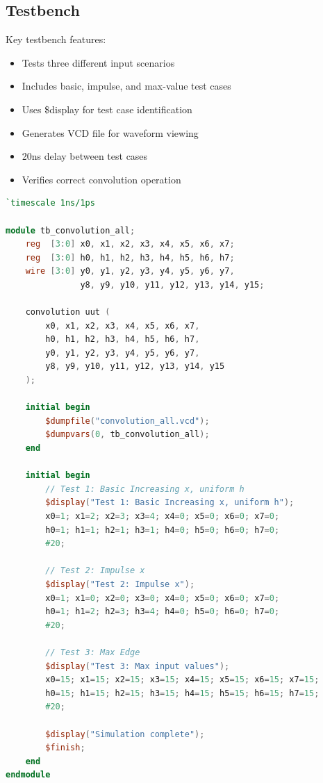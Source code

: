 \documentclass{article}
\begin{document}
\subsection{Testbench}
Key testbench features:
\begin{itemize}
    \item Tests three different input scenarios
    \item Includes basic, impulse, and max-value test cases
    \item Uses \$display for test case identification
    \item Generates VCD file for waveform viewing
    \item 20ns delay between test cases
    \item Verifies correct convolution operation
\end{itemize}
\begin{tcolorbox}[title=Convolution Testbench, breakable]
\begin{lstlisting}[language=Verilog]
`timescale 1ns/1ps

module tb_convolution_all;
    reg  [3:0] x0, x1, x2, x3, x4, x5, x6, x7;
    reg  [3:0] h0, h1, h2, h3, h4, h5, h6, h7;
    wire [3:0] y0, y1, y2, y3, y4, y5, y6, y7,
               y8, y9, y10, y11, y12, y13, y14, y15;

    convolution uut (
        x0, x1, x2, x3, x4, x5, x6, x7,
        h0, h1, h2, h3, h4, h5, h6, h7,
        y0, y1, y2, y3, y4, y5, y6, y7,
        y8, y9, y10, y11, y12, y13, y14, y15
    );

    initial begin
        $dumpfile("convolution_all.vcd");
        $dumpvars(0, tb_convolution_all);
    end

    initial begin
        // Test 1: Basic Increasing x, uniform h
        $display("Test 1: Basic Increasing x, uniform h");
        x0=1; x1=2; x2=3; x3=4; x4=0; x5=0; x6=0; x7=0;
        h0=1; h1=1; h2=1; h3=1; h4=0; h5=0; h6=0; h7=0;
        #20;

        // Test 2: Impulse x
        $display("Test 2: Impulse x");
        x0=1; x1=0; x2=0; x3=0; x4=0; x5=0; x6=0; x7=0;
        h0=1; h1=2; h2=3; h3=4; h4=0; h5=0; h6=0; h7=0;
        #20;

        // Test 3: Max Edge
        $display("Test 3: Max input values");
        x0=15; x1=15; x2=15; x3=15; x4=15; x5=15; x6=15; x7=15;
        h0=15; h1=15; h2=15; h3=15; h4=15; h5=15; h6=15; h7=15;
        #20;

        $display("Simulation complete");
        $finish;
    end
endmodule
\end{lstlisting}
\end{tcolorbox}
\end{document}
